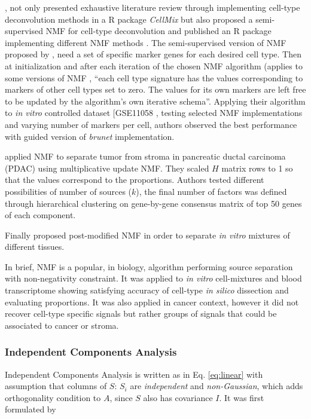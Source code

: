 \documentclass[12pt,]{book}
\theoremstyle{definition}
\theoremstyle{definition}
\theoremstyle{definition}
\theoremstyle{remark}
\begin{document}
\citet{Shen-Orr2013}, not only presented exhaustive literature review
through implementing cell-type deconvolution methods in a R package
\emph{CellMix} \citep{Gaujoux2013} but also proposed a semi-supervised
NMF for cell-type deconvolution and published an R package implementing
different NMF methods \citep{Gaujoux2010}. The semi-supervised version
of NMF proposed by \citet{Gaujoux2013}, need a set of specific marker
genes for each desired cell type. Then at initialization and after each
iteration of the chosen NMF algorithm (applies to some versions of NMF
\citep{Seung1999, Brunet2004, PascualMontano2006}, ``each cell type
signature has the values corresponding to markers of other cell types
set to zero. The values for its own markers are left free to be updated
by the algorithm's own iterative schema''. Applying their algorithm to
\emph{in vitro} controlled dataset {[}GSE11058 \citep{Abbas2009},
testing selected NMF implementations and varying number of markers per
cell, authors observed the best performance with guided version of
\emph{brunet} \citep{Brunet2004} implementation.

\citet{Moffitt2015} applied NMF to separate tumor from stroma in
pancreatic ductal carcinoma (PDAC) using multiplicative update NMF. They
scaled \(H\) matrix rows to 1 so that the values correspond to the
proportions. Authors tested different possibilities of number of sources
(\(k\)), the final number of factors was defined through hierarchical
clustering on gene-by-gene consensus matrix of top 50 genes of each
component.

Finally \citet{Liu2017} proposed post-modified NMF in order to separate
\emph{in vitro} mixtures of different tissues.

In brief, NMF is a popular, in biology, algorithm performing source
separation with non-negativity constraint. It was applied to \emph{in
vitro} cell-mixtures and blood transcriptome showing satisfying accuracy
of cell-type \emph{in silico} dissection and evaluating proportions. It
was also applied in cancer context, however it did not recover cell-type
specific signals but rather groups of signals that could be associated
to cancer or stroma.

\hypertarget{independent-components-analysis}{%
\subsubsection{Independent Components
Analysis}\label{independent-components-analysis}}

Independent Components Analysis is written as in Eq. \eqref{eq:linear}
with assumption that columns of \(S\): \(S_i\) are \emph{independent}
and \emph{non-Gaussian}, which adds orthogonality condition to \(A\),
since \(S\) also has covariance \(I\). It was first formulated by
\citet{Herault1986}
\end{document}
